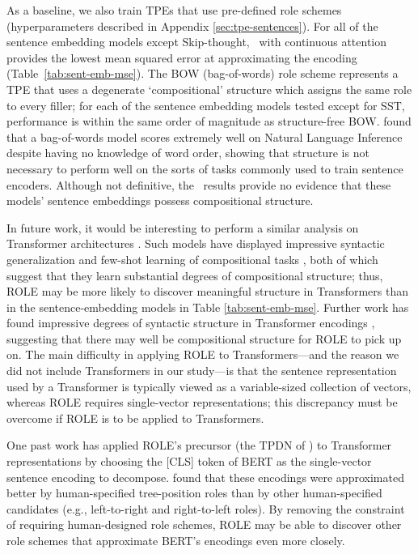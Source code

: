 As a baseline, we also train TPEs that use pre-defined role schemes (hyperparameters described in Appendix \ref{sec:tpe-sentences}). For all of the sentence embedding models except Skip-thought, \RLN\ with continuous attention provides the lowest mean squared error at approximating the encoding (Table~\ref{tab:sent-emb-mse}). The BOW (bag-of-words) role scheme represents a TPE that uses a degenerate `compositional' structure which assigns the same role to every filler; for each of the sentence embedding models tested except for SST, performance is  within the same order of magnitude as structure-free BOW. \citet{parikh2016decomposable} found that a bag-of-words model scores extremely well on Natural Language Inference despite having no knowledge of word order, showing that structure is not necessary to perform well on the sorts of tasks commonly used to train sentence encoders. Although not definitive, the \RLN\ results provide no evidence that these models' sentence embeddings possess compositional structure.

In future work, it would be interesting to perform a similar analysis on Transformer architectures \citep{vaswani2017attention}. Such models have displayed impressive syntactic generalization \cite{hu2020systematic} and few-shot learning of compositional tasks \cite{brown2020language}, both of which suggest that they learn substantial degrees of compositional structure; thus, ROLE may be more likely to discover meaningful structure in Transformers than in the sentence-embedding models in Table \ref{tab:sent-emb-mse}. Further work has found impressive degrees of syntactic structure in Transformer encodings \cite{hewitt2019structural}, suggesting that there may well be compositional structure for ROLE to pick up on. The main difficulty in applying ROLE to Transformers---and the reason we did not include Transformers in our study---is that the sentence representation used by a Transformer is typically viewed as a variable-sized collection of vectors, whereas ROLE requires single-vector representations; this discrepancy must be overcome if ROLE is to be applied to Transformers. 

One past work \cite{jawahar-etal-2019-bert} has applied ROLE's precursor (the TPDN of \citet{mccoy}) to Transformer representations by choosing the [CLS] token of BERT \cite{devlin2019bert} as the single-vector sentence encoding to decompose. \citeauthor{jawahar-etal-2019-bert} found that these encodings were approximated better by human-specified tree-position roles than by other human-specified candidates (e.g., left-to-right and right-to-left roles). By removing the constraint of requiring human-designed role schemes, ROLE may be able to discover other role schemes that approximate BERT's encodings even more closely.

